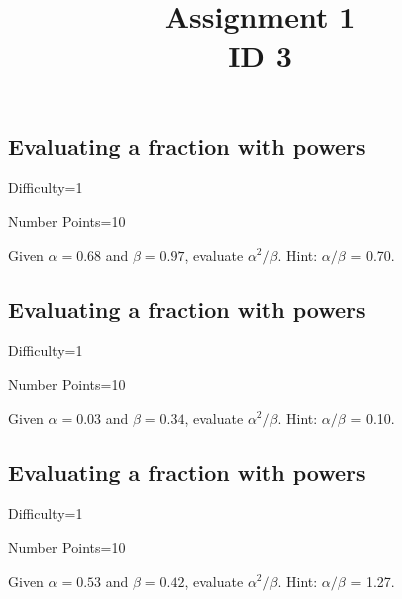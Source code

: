\documentclass{article}
\title{Assignment 1 \\ ID 3}
\begin{document}
\maketitle

\section{} 



\subsection{Evaluating a fraction with powers}

Difficulty=1

Number Points=10

Given $\alpha = 0.68$ and $\beta = 0.97$, evaluate $\alpha^{2}/\beta$. Hint: $\alpha/\beta$ = 0.70.

\subsection{Evaluating a fraction with powers}

Difficulty=1

Number Points=10

Given $\alpha = 0.03$ and $\beta = 0.34$, evaluate $\alpha^{2}/\beta$. Hint: $\alpha/\beta$ = 0.10.

\subsection{Evaluating a fraction with powers}

Difficulty=1

Number Points=10

Given $\alpha = 0.53$ and $\beta = 0.42$, evaluate $\alpha^{2}/\beta$. Hint: $\alpha/\beta$ = 1.27.
\end{document}
